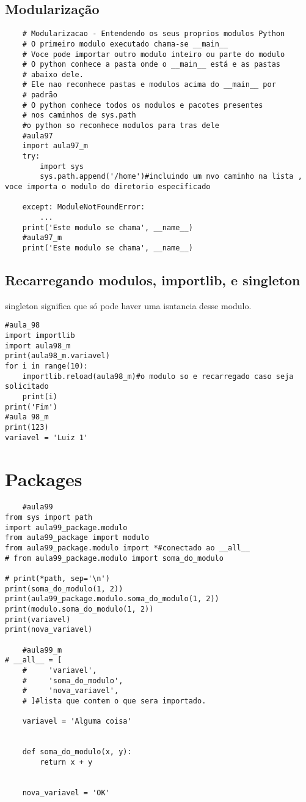 \documentclass{article}
\begin{document}
\subsection{Modularização}
\begin{lstlisting}
    # Modularizacao - Entendendo os seus proprios modulos Python
    # O primeiro modulo executado chama-se __main__
    # Voce pode importar outro modulo inteiro ou parte do modulo
    # O python conhece a pasta onde o __main__ está e as pastas
    # abaixo dele.
    # Ele nao reconhece pastas e modulos acima do __main__ por
    # padrão
    # O python conhece todos os modulos e pacotes presentes
    # nos caminhos de sys.path
    #o python so reconhece modulos para tras dele
    #aula97
    import aula97_m
    try:
        import sys
        sys.path.append('/home')#incluindo um nvo caminho na lista , voce importa o modulo do diretorio especificado

    except: ModuleNotFoundError:
        ...
    print('Este modulo se chama', __name__) 
    #aula97_m
    print('Este modulo se chama', __name__)
\end{lstlisting}  
\subsection{Recarregando modulos, importlib, e singleton}
singleton significa que só pode haver uma isntancia desse modulo. 
\begin{lstlisting}
#aula_98
import importlib
import aula98_m
print(aula98_m.variavel)
for i in range(10):
    importlib.reload(aula98_m)#o modulo so e recarregado caso seja solicitado
    print(i)
print('Fim')
#aula 98_m
print(123)
variavel = 'Luiz 1'
\end{lstlisting}    
\section{Packages}
\begin{lstlisting}
    #aula99
from sys import path
import aula99_package.modulo
from aula99_package import modulo
from aula99_package.modulo import *#conectado ao __all__
# from aula99_package.modulo import soma_do_modulo

# print(*path, sep='\n')
print(soma_do_modulo(1, 2))
print(aula99_package.modulo.soma_do_modulo(1, 2))
print(modulo.soma_do_modulo(1, 2))
print(variavel)
print(nova_variavel)

    #aula99_m
# __all__ = [
    #     'variavel',
    #     'soma_do_modulo',
    #     'nova_variavel',
    # ]#lista que contem o que sera importado.
    
    variavel = 'Alguma coisa'
    
    
    def soma_do_modulo(x, y):
        return x + y
    
    
    nova_variavel = 'OK'
\end{lstlisting}
\end{document}
